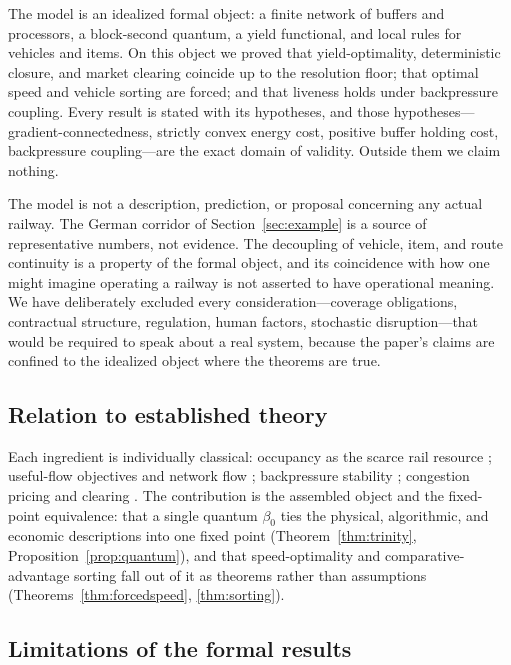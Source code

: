 \documentclass[11pt,twocolumn,a4paper]{article}
\theoremstyle{definition}
\theoremstyle{remark}
\newcommand{\blocktime}{\beta_0}
\begin{document}
The model is an idealized formal object: a finite network of buffers and processors, a block-second quantum, a yield functional, and local rules for vehicles and items. On this object we proved that yield-optimality, deterministic closure, and market clearing coincide up to the resolution floor; that optimal speed and vehicle sorting are forced; and that liveness holds under backpressure coupling. Every result is stated with its hypotheses, and those hypotheses---gradient-connectedness, strictly convex energy cost, positive buffer holding cost, backpressure coupling---are the exact domain of validity. Outside them we claim nothing.

The model is not a description, prediction, or proposal concerning any actual railway. The German corridor of Section~\ref{sec:example} is a source of representative numbers, not evidence. The decoupling of vehicle, item, and route continuity is a property of the formal object, and its coincidence with how one might imagine operating a railway is not asserted to have operational meaning. We have deliberately excluded every consideration---coverage obligations, contractual structure, regulation, human factors, stochastic disruption---that would be required to speak about a real system, because the paper's claims are confined to the idealized object where the theorems are true.

\subsection{Relation to established theory}

Each ingredient is individually classical: occupancy as the scarce rail resource \cite{uic406,hansen2008}; useful-flow objectives and network flow \cite{ahuja1993,ford1956}; backpressure stability \cite{tassiulas1992,neely2010}; congestion pricing and clearing \cite{vickrey1969,beckmann1956,arrow1971}. The contribution is the assembled object and the fixed-point equivalence: that a single quantum $\blocktime$ ties the physical, algorithmic, and economic descriptions into one fixed point (Theorem~\ref{thm:trinity}, Proposition~\ref{prop:quantum}), and that speed-optimality and comparative-advantage sorting fall out of it as theorems rather than assumptions (Theorems~\ref{thm:forcedspeed}, \ref{thm:sorting}).

\subsection{Limitations of the formal results}
\end{document}
